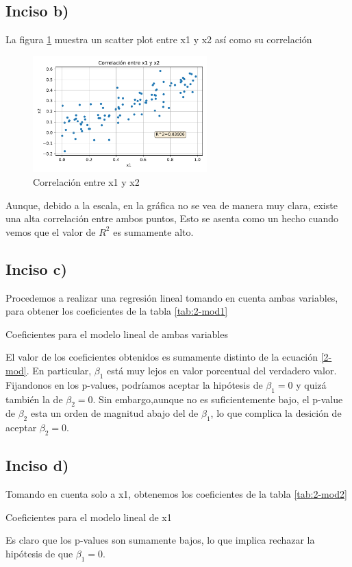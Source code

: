 \documentclass[11pt]{article}
\begin{document}
\subsection{Inciso b)}
La figura \ref{fig:2-corr} muestra un scatter plot entre x1 y x2 así como su correlación
\begin{figure}[H]
    \centering
    \includegraphics[width=0.6\textwidth]{2-corr.pdf}
    \caption{Correlación entre x1 y x2}
    \label{fig:2-corr}
\end{figure}
Aunque, debido a la escala, en la gráfica no se vea de manera muy clara, existe una alta correlación entre ambos puntos, Esto se asenta como un hecho cuando vemos que el valor de $R^2$ es sumamente alto. 
\subsection{Inciso c)}
Procedemos a realizar una regresión lineal tomando en cuenta ambas variables, para obtener los coeficientes de la tabla \ref{tab:2-mod1}
\begin{table}[H]
    \centering
    
    \caption{Coeficientes para el modelo lineal de ambas variables}
    \label{tab:2-mod1}
\end{table}
El valor de los coeficientes obtenidos es sumamente distinto de la ecuación \ref{2-mod}. En particular, $\beta_1$ está muy lejos en valor porcentual del verdadero valor. Fijandonos en los p-values, podríamos aceptar la hipótesis de $\beta_1=0$ y quizá también la de $\beta_2 = 0$. Sin embargo,aunque no es suficientemente bajo, el p-value de $\beta_2$ esta un orden de magnitud abajo del de $\beta_1$, lo que complica la desición de aceptar $\beta_2 = 0$.
\subsection{Inciso d)}
Tomando en cuenta solo a x1, obtenemos los coeficientes de la tabla \ref{tab:2-mod2}
\begin{table}[H]
    \centering
    
    \caption{Coeficientes para el modelo lineal de x1}
    \label{tab:2-mod2}
\end{table}
Es claro que los p-values son sumamente bajos, lo que implica rechazar la hipótesis de que $\beta_1 = 0$.
\end{document}
